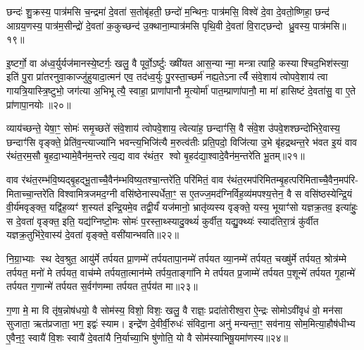 छन्दः॑ शु॒क्रस्य॒ पात्र॑मसि च॒न्द्रमा॑ दे॒वता॑ स॒तोबृ॑हती॒ छन्दो॑ म॒न्थिनः॒ पात्र॑मसि॒ विश्वे॑ दे॒वा दे॒वतो॒ष्णिहा॒ छन्द॑ आग्रय॒णस्य॒ पात्र॑म॒सीन्द्रो॑ दे॒वता॑ क॒कुच्छन्द॑ उ॒क्थाना॒म्पात्र॑मसि पृथि॒वी दे॒वता॑ वि॒राट्छन्दो ध्रु॒वस्य॒ पात्र॑मसि॥१९॥

{\anuvakamend[{अ॒न्तरि॑ख्षेण बृह॒ती त्रय॑स्त्रिशच्च॥६॥}]}

इ॒ष्टर्गो॒ वा अ॑ध्व॒र्युर्यज॑मानस्ये॒ष्टर्गः॒ खलु॒ वै पूर्वो॒ऽर्ष्टुः ख्षी॑यत आस॒न्यान्मा॒ मन्त्रात्पाहि॒ कस्याश्चिद॒भिश॑स्त्या॒ इति॑ पु॒रा प्रा॑तरनुवा॒काज्जु॑हुयादा॒त्मन॑ एव॒ तद॑ध्व॒र्युः पु॒रस्ता॒च्छर्म॑ नह्य॒तेऽनार्त्यै संवे॒शाय॑ त्वोपवे॒शाय॑ त्वा गायत्रि॒यास्त्रि॒ष्टुभो॒ जग॑त्या अ॒भिभूत्यै॒ स्वाहा॒ प्राणा॑पानौ मृ॒त्योर्मा॑ पात॒म्प्राणा॑पानौ॒ मा मा॑ हासिष्टं दे॒वता॑सु॒ वा ए॒ते प्रा॑णापा॒नयोः॥२०॥

व्याय॑च्छन्ते॒ येषा॒ꣳ॒ सोमः॑ समृ॒च्छते॑ संवे॒शाय॑ त्वोपवे॒शाय॒ त्वेत्या॑ह॒ छन्दाꣳ॑सि॒ वै सं॑वे॒श उ॑पवे॒शश्छन्दो॑भिरे॒वास्य॒ छन्दाꣳ॑सि वृङ्क्ते॒ प्रेति॑व॒न्त्याज्या॑नि भवन्त्य॒भिजि॑त्यै म॒रुत्व॑तीः प्रति॒पदो॒ विजि॑त्या उ॒भे बृ॑हद्रथन्त॒रे भ॑वत इ॒यं वाव र॑थंत॒रम॒सौ बृ॒हदा॒भ्यामे॒वैन॑म॒न्तरेत्य॒द्य वाव र॑थंत॒र श्वो बृ॒हद॑द्या॒श्वादे॒वैन॑म॒न्तरे॑ति भू॒तम्॥२१॥

वाव र॑थंत॒रम्भ॑वि॒ष्यद्बृ॒हद्भू॒ताच्चै॒वैन॑म्भविष्य॒तश्चा॒न्तरे॑ति॒ परि॑मितं॒ वाव र॑थंत॒रमप॑रिमितम्बृ॒हत्परि॑मिताच्चै॒वैन॒मप॑रि- मिताच्चा॒न्तरे॑ति विश्वामित्रजमद॒ग्नी वसि॑ष्ठेनास्पर्धेता॒ꣳ॒ स ए॒तज्ज॒मद॑ग्निर्विह॒व्य॑मपश्य॒त्तेन॒ वै स वसि॑ष्ठस्येन्द्रि॒यं वी॒र्य॑मवृङ्क्त॒ यद्वि॑ह॒व्यꣳ॑ श॒स्यत॑ इन्द्रि॒यमे॒व तद्वी॒र्यं॑ यज॑मानो॒ भ्रातृ॑व्यस्य वृङ्क्ते॒ यस्य॒ भूयाꣳ॑सो यज्ञक्र॒तव॒ इत्या॑हुः॒ स दे॒वता॑ वृङ्क्त॒ इति॒ यद्य॑ग्निष्टो॒मः सोमः॑ प॒रस्ता॒थ्स्यादु॒क्थ्यं॑ कुर्वीत॒ यद्यु॒क्थ्यः॑ स्याद॑तिरा॒त्रं कु॑र्वीत यज्ञक्र॒तुभि॑रे॒वास्य॑ दे॒वता॑ वृङ्क्ते॒ वसी॑यान्भवति॥२२॥

{\anuvakamend[{प्रा॒णा॒पा॒नयोर्भू॒तं वृ॑ङ्क्ते॒ऽष्टाविꣳ॑शतिश्च॥७॥}]}

नि॒ग्रा॒भ्याः स्थ देव॒श्रुत॒ आयु॑र्मे तर्पयत प्रा॒णम्मे॑ तर्पयतापा॒नम्मे॑ तर्पयत व्या॒नम्मे॑ तर्पयत॒ चख्षु॑र्मे तर्पयत॒ श्रोत्र॑म्मे तर्पयत॒ मनो॑ मे तर्पयत॒ वाच॑म्मे तर्पयता॒त्मान॑म्मे तर्पय॒ताङ्गा॑नि मे तर्पयत प्र॒जाम्मे॑ तर्पयत प॒शून्मे॑ तर्पयत गृ॒हान्मे॑ तर्पयत ग॒णान्मे॑ तर्पयत स॒र्वग॑णम्मा तर्पयत त॒र्पय॑त मा॥२३॥

ग॒णा मे॒ मा वि तृ॑ष॒न्नोष॑धयो॒ वै सोम॑स्य॒ विशो॒ विशः॒ खलु॒ वै राज्ञः॒ प्रदा॑तोरीश्व॒रा ऐ॒न्द्रः सोमोऽवी॑वृधं वो॒ मन॑सा सुजाता॒ ऋत॑प्रजाता॒ भग॒ इद्वः॑ स्याम। इन्द्रे॑ण दे॒वीर्वी॒रुधः॑ संविदा॒ना अनु॑ मन्यन्ता॒ꣳ॒ सव॑नाय॒ सोम॒मित्या॒हौष॑धीभ्य ए॒वैन॒ꣵ॒ स्वायै॑ वि॒शः स्वायै॑ दे॒वता॑यै नि॒र्याच्या॒भि षु॑णोति॒ यो वै सोम॑स्याभिषू॒यमा॑णस्य॥२४॥


